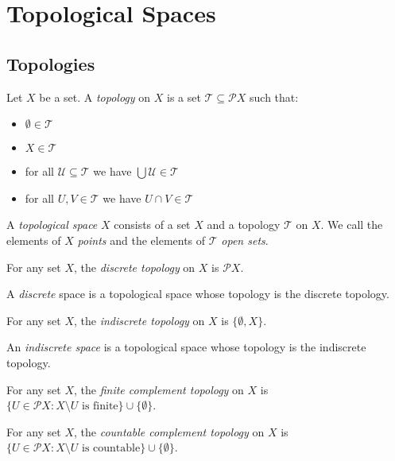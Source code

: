 \chapter{Topological Spaces}

\section{Topologies}

\begin{df}[Topology]
  Let $X$ be a set. A \emph{topology} on $X$ is a set $\mathcal{T} \subseteq \mathcal{P} X$ such that:
  \begin{itemize}
    \item
    $\emptyset \in \mathcal{T}$
    \item
    $X \in \mathcal{T}$
    \item
    for all $\mathcal{U} \subseteq \mathcal{T}$ we have $\bigcup \mathcal{U} \in \mathcal{T}$
    \item
    for all $U, V \in \mathcal{T}$ we have $U \cap V \in \mathcal{T}$
  \end{itemize}

  A \emph{topological space} $X$ consists of a set $X$ and a topology $\mathcal{T}$ on $X$. We call the elements of $X$ \emph{points} and the elements of $\mathcal{T}$ \emph{open sets}.
\end{df}

\begin{df}
  For any set $X$, the \emph{discrete topology} on $X$ is $\mathcal{P} X$.

  A \emph{discrete} space is a topological space whose topology is the discrete topology.
\end{df}

\begin{df}
  For any set $X$, the \emph{indiscrete topology} on $X$ is $\{ \emptyset, X \}$.

  An \emph{indiscrete space} is a topological space whose topology is the indiscrete topology.
\end{df}

\begin{df}
  For any set $X$, the \emph{finite complement topology} on $X$ is $\{ U \in \mathcal{P} X : X \setminus U \text{ is finite} \} \cup \{ \emptyset \}$.
\end{df}

\begin{df}
  For any set $X$, the \emph{countable complement topology} on $X$ is $\{ U \in \mathcal{P} X : X \setminus U \text{ is countable} \} \cup \{ \emptyset \}$.
\end{df}

